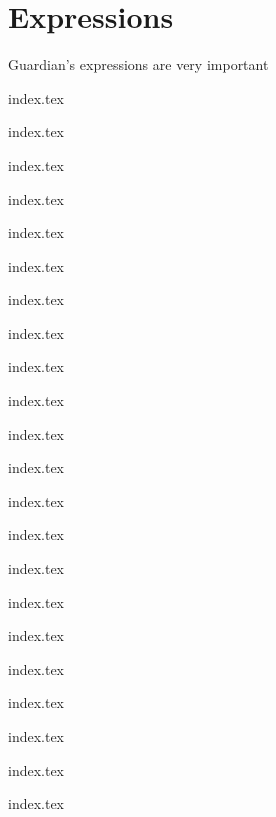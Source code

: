 
\section{Expressions}
{
	Guardian's expressions are very important
	
	{index.tex}
	
	{index.tex}
	
	{index.tex}
	
	{index.tex}
	
	{index.tex}
	
	{index.tex}
	
	{index.tex}
	
	{index.tex}
	
	{index.tex}
	
	{index.tex}
	
	{index.tex}
	
	{index.tex}
	
	{index.tex}
	
	{index.tex}
	
	{index.tex}
	
	{index.tex}
	
	{index.tex}
	
	{index.tex}
	
	{index.tex}
	
	{index.tex}
	
	{index.tex}
	
	{index.tex}
	
}

